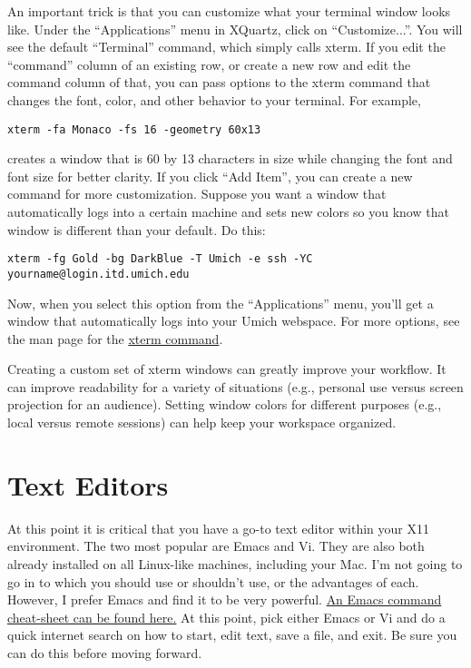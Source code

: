 \documentclass[12pt, letterpaper]{article}
\begin{document}
An important trick is that you can customize what your terminal window looks
like.  Under the ``Applications'' menu in XQuartz, click on ``Customize...''.
You will see the default ``Terminal'' command, which simply calls xterm.
If you edit the ``command'' column of an existing row, or create a new row and
edit the command column of that, you can pass options to the xterm command
that changes the font, color, and other behavior to your terminal.  For example,
\begin{verbatim}
xterm -fa Monaco -fs 16 -geometry 60x13
\end{verbatim}
creates a window that is 60 by 13 characters in size while changing the font and
font size for better clarity.  If you click ``Add Item'', you can create a new
command for more customization.  Suppose you want a window that automatically
logs into a certain machine and sets new colors so you know that window is
different than your default.  Do this:
\begin{verbatim}
xterm -fg Gold -bg DarkBlue -T Umich -e ssh -YC yourname@login.itd.umich.edu
\end{verbatim}
Now, when you select this option from the ``Applications'' menu, you'll get
a window that automatically logs into your Umich webspace.  For more options,
see the man page for the
\href{http://linux.die.net/man/1/xterm}{xterm command}.

\begin{tcolorbox}[title=\textbf{Customize for Success}]
  Creating a custom set of xterm windows can greatly improve your workflow.
  It can improve readability for a variety of situations (e.g., personal use
  versus screen projection for an audience).
  Setting window colors for different purposes (e.g., local versus remote
  sessions) can help keep your workspace organized.
\end{tcolorbox}

\section{Text Editors}
At this point it is critical that you have a go-to text editor within your
X11 environment.  The two most popular are Emacs and Vi.  They are also both
already installed on all Linux-like machines, including your Mac.
I'm not going to go in to which you should use or shouldn't use, or the
advantages of each.  However, I prefer Emacs and find it to be very powerful.
\href{https://www.gnu.org/software/emacs/refcards/pdf/refcard.pdf}{An
  Emacs command cheat-sheet can be found here.}  At this point, pick either
Emacs or Vi and do a quick internet search on how to start, edit text, save
a file, and exit.  Be sure you can do this before moving forward.
\end{document}
